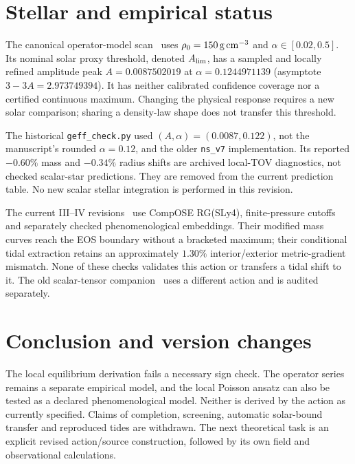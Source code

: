 \documentclass[11pt,a4paper]{article}
\begin{document}
\section{Stellar and empirical status}
The canonical operator-model scan~\cite{Series_paper1} uses $\rho_0=150\,{\rm g\,cm^{-3}}$
and $\alpha\in[0.02,0.5]$. Its nominal solar proxy threshold, denoted
$A_{\rm lim}$, has a sampled and locally refined amplitude peak
$A=0.0087502019$ at $\alpha=0.1244971139$ (asymptote $3-3A=2.973749394$).
It has neither calibrated confidence coverage nor a certified continuous
maximum. Changing the physical response requires a new solar comparison;
sharing a density-law shape does not transfer this threshold.

The historical \texttt{geff\_check.py} used $(A,\alpha)=(0.0087,0.122)$,
not the manuscript's rounded $\alpha=0.12$, and the older \texttt{ns\_v7}
implementation. Its reported $-0.60\%$ mass and $-0.34\%$ radius shifts
are archived local-TOV diagnostics, not checked scalar-star predictions.
They are removed from the current prediction table. No new scalar stellar
integration is performed in this revision.

The current III--IV revisions~\cite{Series_paper3,Series_paper4} use CompOSE RG(SLy4), finite-pressure
cutoffs and separately checked phenomenological embeddings. Their modified
mass curves reach the EOS boundary without a bracketed maximum; their
conditional tidal extraction retains an approximately $1.30\%$
interior/exterior metric-gradient mismatch. None of these checks validates
this action or transfers a tidal shift to it. The old scalar-tensor companion~\cite{Series_companion}
uses a different action and is audited separately.

\section{Conclusion and version changes}
The local equilibrium derivation fails a necessary sign check. The operator
series remains a separate empirical model, and the local Poisson ansatz can
also be tested as a declared phenomenological model. Neither is derived by
the action as currently specified. Claims of completion, screening,
automatic solar-bound transfer and reproduced tides are withdrawn.
The next theoretical task is an explicit revised action/source construction,
followed by its own field and observational calculations.
\end{document}
